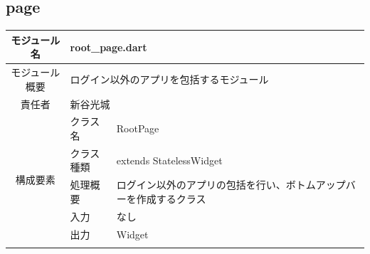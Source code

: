 \clearpage
\subsection{page}\label{sec:page}
\begin{table}[H]
  \centering
  \begin{tabular}{|c|l|l|} \hline
    モジュール名                & \multicolumn{2}{l|}{root\_page.dart}                                                                                                                                                                            \\ \hline
    モジュール概要               & \multicolumn{2}{p{12cm}|}{ログイン以外のアプリを包括するモジュール}                                                                                                                                                                 \\ \hline
    責任者                   & \multicolumn{2}{l|}{新谷光城}                                                                                                                                                                                       \\ \hline
    \multirow{7}{*}{構成要素} & クラス名                                                                                                                                             & RootPage                                                     \\ \cline{2-3}
                          & クラス種類                                                                                                                                            & extends StatelessWidget                                      \\ \cline{2-3}
                          & 処理概要                                                                                                                                             & \multicolumn{1}{p{12cm}|}{ログイン以外のアプリの包括を行い、ボトムアップバーを作成するクラス} \\ \cline{2-3}
                          & 入力                                                                                                                                               & なし                                                           \\ \cline{2-3}
                          & 出力                                                                                                                                               & Widget                                                       \\ \cline{2-3}

\end{tabular}
\end{table}
